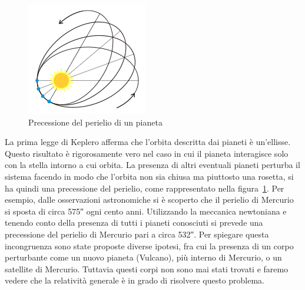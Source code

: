 \begin{figure}
  \centering
  \includegraphics{figure/precessione_perielio}
  \caption{Precessione del perielio di un pianeta}
  \label{fig:precessione-perielio}
\end{figure}
La prima legge di Keplero afferma che l'orbita descritta dai pianeti è
un'ellisse.  Questo risultato è rigorosamente vero nel caso in cui il pianeta
interagisce solo con la stella intorno a cui orbita.  La presenza di altri
eventuali pianeti perturba il sistema facendo in modo che l'orbita non sia
chiusa ma piuttosto una rosetta, si ha quindi una precessione del perielio, come
rappresentato nella figura~\ref{fig:precessione-perielio}.  Per esempio, dalle
osservazioni astronomiche si è scoperto che il perielio di Mercurio si sposta di
circa \ang{;;575} ogni cento anni.  Utilizzando la meccanica newtoniana e
tenendo conto della presenza di tutti i pianeti conosciuti si prevede una
precessione del perielio di Mercurio pari a circa \ang{;;532}.  Per spiegare
questa incongruenza sono state proposte diverse ipotesi, fra cui la presenza di
un corpo perturbante come un nuovo pianeta (Vulcano), più interno di Mercurio, o
un satellite di Mercurio.  Tuttavia questi corpi non sono mai stati trovati e
faremo vedere che la relatività generale è in grado di risolvere questo
problema.

